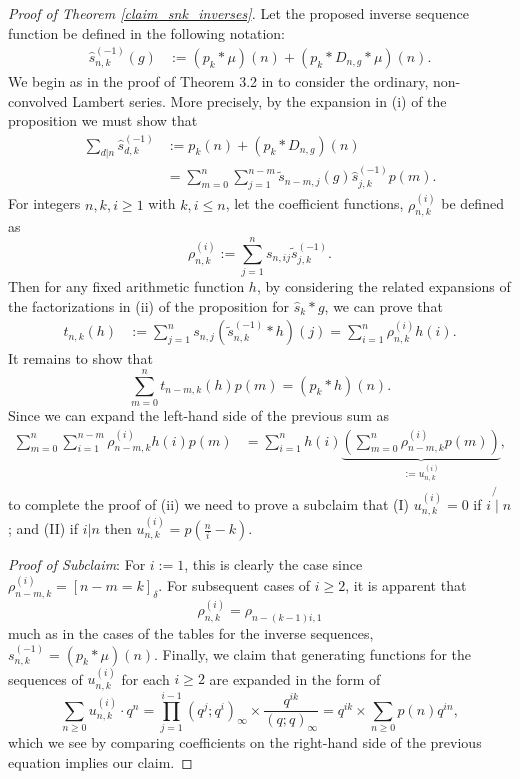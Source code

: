 \documentclass[12pt,reqno,a4letter]{article}
\numberwithin{figure}{section}
\numberwithin{table}{section}
\numberwithin{equation}{section}
\newcommand{\Iverson}[1]{\ensuremath{\left[#1\right]_{\delta}}}
\theoremstyle{plain}
\numberwithin{theorem}{section}
\theoremstyle{definition}
\begin{document}
\begin{proof}[Proof of Theorem \ref{claim_snk_inverses}]  
Let the proposed inverse sequence function be defined in the following notation: 
\begin{align*} 
\widehat{s}_{n,k}^{(-1)}(g) & := (p_k \ast \mu)(n) + (p_k \ast D_{n,g} \ast \mu)(n). 
\end{align*} 
We begin as in the proof of Theorem {3.2} in \cite{MERCA-SCHMIDT-LSFACTTHM} to consider the ordinary, 
non-convolved Lambert series. 
More precisely, by the expansion in (i) of the proposition we must show that 
\begin{align*} 
\sum_{d|n} \widehat{s}_{d,k}^{(-1)} & := p_k(n) + (p_k \ast D_{n,g})(n) \\ 
     & = \sum_{m=0}^n \sum_{j=1}^{n-m} \widetilde{s}_{n-m,j}(g) \widehat{s}_{j,k}^{(-1)} p(m). 
\end{align*} 
For integers $n, k, i \geq 1$ with $k, i \leq n$, let the coefficient functions, $\rho_{n,k}^{(i)}$ 
be defined as 
\[
\rho_{n,k}^{(i)} := \sum_{j=1}^n s_{n,ij} \widetilde{s}_{j,k}^{(-1)}. 
\] 
Then for any fixed arithmetic function $h$,
by considering the related expansions of the 
factorizations in (ii) of the proposition for $\widehat{s}_k \ast g$, we can prove that 
\begin{align*} 
\tag{i}
t_{n,k}(h) & := \sum_{j=1}^n s_{n,j} (\widetilde{s}_{n,k}^{(-1)} \ast h)(j) 
      = \sum_{i=1}^n \rho_{n,k}^{(i)} h(i). 
\end{align*} 
It remains to show that 
\[
\tag{ii} 
\sum_{m=0}^n t_{n-m,k}(h) p(m) = (p_k \ast h)(n). 
\] 
Since we can expand the left-hand side of the previous sum as 
\begin{align*} 
\sum_{m=0}^n \sum_{i=1}^{n-m} \rho_{n-m,k}^{(i)} h(i) p(m) & = 
     \sum_{i=1}^n h(i) \underset{ := u_{n,k}^{(i)}}{\underbrace{\left( 
     \sum_{m=0}^n \rho_{n-m,k}^{(i)} p(m)\right)}}, 
\end{align*} 
to complete the proof of (ii) we need to prove a subclaim 
that (I) $u_{n,k}^{(i)} = 0$ if $i \not{\mid} n$; and (II) 
if $i | n$ then $u_{n,k}^{(i)} = p\left(\frac{n}{i}-k\right)$. 

\noindent
\textit{Proof of Subclaim}: 
For $i := 1$, this is clearly the case since $\rho_{n-m,k}^{(i)} = \Iverson{n-m=k}$. 
For subsequent cases of $i \geq 2$, it is apparent that 
$$\rho_{n,k}^{(i)} = \rho_{n-(k-1)i,1}$$ much as in the cases of the tables for the inverse sequences, 
$s_{n,k}^{(-1)} = (p_k \ast \mu)(n)$. Finally, we claim that generating functions for the 
sequences of $u_{n,k}^{(i)}$ for each $i \geq 2$ are expanded in the form of
\[
\sum_{n \geq 0} u_{n,k}^{(i)} \cdot q^n = 
     \prod_{j=1}^{i-1} (q^j; q^i)_{\infty} \times \frac{q^{ik}}{(q; q)_{\infty}} = 
     q^{ik} \times \sum_{n \geq 0} p(n) q^{in}, 
\] 
which we see by comparing coefficients on the right-hand side of the 
previous equation implies our claim. 


\end{proof}
\end{document}
